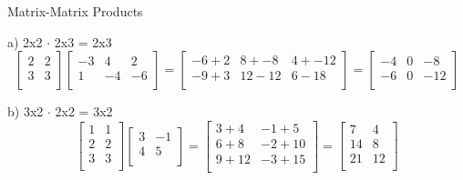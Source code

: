 \documentclass[12pt]{article}
\newcommand{\sqbrl}{\left[}
\newcommand{\sqbrr}{\right]}
\newenvironment{problem}[2][Problem]{\begin{trivlist}
\item[\hskip \labelsep {\bfseries #1}\hskip \labelsep {\bfseries #2.}]}{\end{trivlist}}
\begin{document}
\begin{problem}{2}
	Matrix-Matrix Products
\end{problem}
a) 2x2 $\cdot$ 2x3 = 2x3\\
	\[\sqbrl\begin{matrix}2 & 2\\3 & 3\\\end{matrix}\sqbrr\sqbrl\begin{matrix}-3 & 4 & 2\\1 & -4 & -6\\\end{matrix}\sqbrr
	=\sqbrl\begin{matrix}-6 + 2 & 8 + -8 & 4 + -12\\-9 + 3 & 12 - 12 & 6 -18\\\end{matrix}\sqbrr
	=\sqbrl\begin{matrix}-4 & 0 & -8\\-6 & 0 & -12\\\end{matrix}\sqbrr\]
 
b) 3x2 $\cdot$ 2x2 = 3x2\\
	\[\sqbrl\begin{matrix}1 & 1\\2 & 2\\3 & 3\\\end{matrix}\sqbrr\sqbrl\begin{matrix}3 & -1\\4 & 5\\\end{matrix}\sqbrr
	=\sqbrl\begin{matrix}3 + 4 & -1 + 5\\6+8 & -2 + 10\\ 9 + 12 & -3 + 15\\\end{matrix}\sqbrr
	=\sqbrl\begin{matrix}7 & 4\\14 & 8\\21 & 12\\\end{matrix}\sqbrr\]
 
\end{document}
